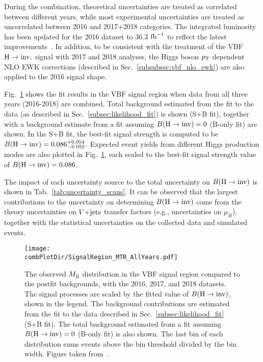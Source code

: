 During the combination, theoretical uncertainties are treated as correlated between different years, while most experimental
uncertainties are treated as uncorrelated between 2016 and 2017+2018 categories.
The integrated luminosity has been updated for the 2016 dataset to 36.3 $\textrm{fb}^{-1}$ to reflect the latest
improvements~\cite{CMS:2021xjt}. In addition, to be consistent with the treatment of the VBF
$\textrm{H} \rightarrow \textrm{inv.}$ signal with 2017 and 2018 analyses, the Higgs boson $p_{\textrm{T}}$ dependent NLO EWK corrections 
(described in Sec.~\ref{subsubsec:vbf_nlo_ewk}) are also applied to the 2016 signal shape.

Fig.~\ref{fig:mtr_comb_with_2016} shows the fit results in the VBF signal region when data from all three years (2016-2018) 
are combined. Total background estimated from the fit to the data (as described in Sec.~\ref{subsec:likelihood_fit}) is shown (S+B fit),
together with a background estimate from a fit assuming ${{B}(\textrm{H}\rightarrow\text{inv})}=0$ (B-only fit) are shown. In the S+B fit, the best-fit signal strength is computed
to be ${{B}(\textrm{H}\rightarrow\text{inv})}=0.086^{+0.054}_{-0.052}$. Expected event yields from different Higgs production modes are also plotted in Fig.~\ref{fig:mtr_comb_with_2016}, 
each scaled to the best-fit signal strength value of ${{B}(\textrm{H}\rightarrow\text{inv})}=0.086$.

The impact of each uncertainty source to the total uncertainty on ${{B}(\textrm{H}\rightarrow\text{inv})}$ is shown in Tab.~\ref{tab:uncertainty_scans}. It can be observed that
the largest contributions to the uncertainty on determining ${{B}(\textrm{H}\rightarrow\text{inv})}$ come from the theory uncertainties on $V\text{+jets}$ transfer factors (e.g., uncertainties on $\mu_{R}$),
together with the statistical uncertainties on the collected data and simulated events.

\begin{figure}[htbp]
    \centering
    \texttt{[image: \\combPlotDir/SignalRegion\_MTR\_AllYears.pdf]}
    \caption{The observed $M_{\textrm{jj}}$ distribution in the VBF signal region compared to the postfit backgrounds, with the 
    2016, 2017, and 2018 datasets. The signal processes are scaled by the fitted value of ${{B}(\textrm{H}\rightarrow\text{inv})}$, shown in the legend. 
    The background contributions are estimated from 
    the fit to the data described in Sec.~\ref{subsec:likelihood_fit} (S+B fit). 
    The total background estimated from a fit assuming ${{B}(\textrm{H}\rightarrow\text{inv})}=0$ (B-only fit) is also shown. 
    The last bin of each distribution sums events above the bin threshold divided by the bin width. Figure taken from~\cite{VBFHinvAnalysisPaper}.}
    \label{fig:mtr_comb_with_2016}
\end{figure}


